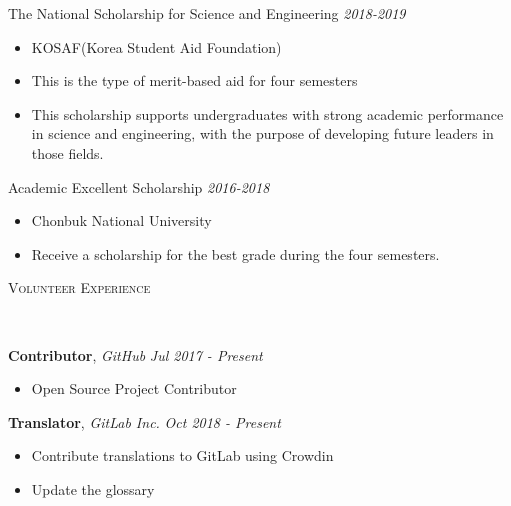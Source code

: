 \documentclass[10pt]{article}
\newenvironment{changemargin}[2]{
  \begin{list}{}{
    \setlength{\topsep}{0pt}
    \setlength{\leftmargin}{#1}
    \setlength{\rightmargin}{#2}
    \setlength{\listparindent}{\parindent}
    \setlength{\itemindent}{\parindent}
    \setlength{\parsep}{\parskip}
  }
  \item[]}{\end{list}
}
\newcommand{\lineover}{
	\begin{changemargin}{-0.05in}{-0.05in}
		\vspace*{-8pt}
		\hrulefill \\
		\vspace*{-2pt}
	\end{changemargin}
}
\newcommand{\header}[1]{
	\begin{changemargin}{-0.5in}{-0.5in}
		\scshape{#1}\\
  	\lineover
	\end{changemargin}
}
\newcommand{\labdescription}[1]{
	\begin{changemargin}{0.15in}{0.15in}
    \smallskip
		{#1}
    \medskip
	\end{changemargin}
}
\newcommand{\labtitle}[3]{
	\textbf{#1}, \emph{#2} \hfill \emph{#3}\\
}
\newcommand{\award}[2]{
	{#1} \hfill \emph{#2}\\ \medskip
}
\newenvironment{body} {
	\vspace*{-16pt}
	\begin{changemargin}{-0.25in}{-0.5in}
  }
	{\end{changemargin}
}
\begin{document}
\begin{body}
	\vspace{14pt}

\award{The National Scholarship for Science and Engineering}{2018-2019}
\begin{itemize} \itemsep -0pt  %
      \item  KOSAF(Korea Student Aid Foundation)
      \item This is the type of merit-based aid for four semesters
      \item This scholarship supports undergraduates with strong academic performance in science and engineering, with the purpose of developing future leaders in those fields.
  	\end{itemize}
	
	\award{Academic Excellent Scholarship}{2016-2018}
\begin{itemize} \itemsep -0pt  %
      \item  Chonbuk National University
      \item Receive a scholarship for the best grade during the four semesters.
  	\end{itemize}

\end{body}


\medskip

\pagebreak 


\header{Volunteer Experience}

\begin{body}
	\vspace{14pt}

  	\labtitle{Contributor}{GitHub}{Jul 2017 - Present}
  \labdescription {
  	\begin{itemize} \itemsep -0pt  %
      \item Open Source Project Contributor
  	\end{itemize}
  }
  
  	\labtitle{Translator}{GitLab Inc.}{Oct 2018 - Present}
  \labdescription {
  	\begin{itemize} \itemsep -0pt  %
      \item Contribute translations to GitLab using Crowdin
      \item Update the glossary
  	\end{itemize}
  }

\end{body}
\end{document}
